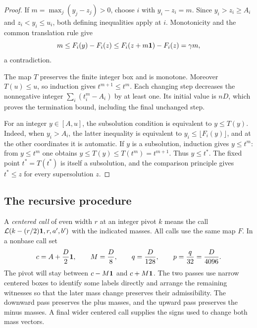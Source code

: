 \begin{proof}
If $m=\max_j(y_j-z_j)>0$, choose $i$ with $y_i-z_i=m$.
Since $y_i>z_i\ge A_i$ and $z_i<y_i\le u_i$, both defining
inequalities apply at $i$.  Monotonicity and the common translation
rule give
\[
 m\le F_i(y)-F_i(z)
   \le F_i(z+m\mathbf 1)-F_i(z)=\gamma m,
\]
a contradiction.

The map $T$ preserves the finite integer box and is monotone.
Moreover $T(u)\le u$, so induction gives $t^{m+1}\le t^m$.
Each changing step decreases the nonnegative integer
$\sum_i(t_i^m-A_i)$ by at least one.  Its initial value is $nD$,
which proves the termination bound, including the final unchanged
step.

For an integer $y\in[A,u]$, the subsolution condition is equivalent
to $y\le T(y)$.  Indeed, when $y_i>A_i$, the latter inequality is
equivalent to $y_i\le\lfloor F_i(y)\rfloor$, and at the other
coordinates it is automatic.  If $y$ is a subsolution, induction
gives $y\le t^m$: from $y\le t^m$ one obtains
$y\le T(y)\le T(t^m)=t^{m+1}$.  Thus $y\le t^*$.
The fixed point $t^*=T(t^*)$ is itself a subsolution, and the
comparison principle gives $t^*\le z$ for every supersolution $z$.
\end{proof}

\subsection{The recursive procedure}

A \emph{centered call} of even width $r$ at an integer pivot $k$
means the call $\mathcal L(k-(r/2)\mathbf 1,r,a',b')$ with the indicated
masses.  All calls use the same map $F$.  In a nonbase call set
\begin{equation}
 c=A+\frac D2\mathbf 1,\qquad M=\frac D8,\qquad
 q=\frac D{128},\qquad p=\frac q{32}=\frac D{4096}.
 \label{eq:label-scales}
\end{equation}
The pivot will stay between $c-M\mathbf 1$ and $c+M\mathbf 1$.
The two passes use narrow centered boxes to identify some labels
directly and arrange the remaining witnesses so that the later mass
change preserves their admissibility. The downward pass preserves
the plus masses, and the upward pass preserves the minus masses.
A final wider centered call supplies the signs used to change both
mass vectors.

